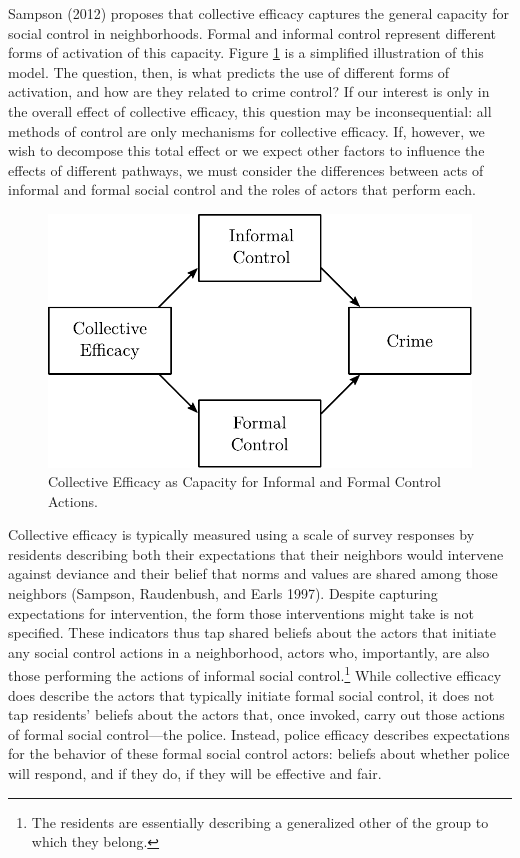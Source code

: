 \documentclass [11pt, proquest] {uwthesis}[2015/03/03]
\begin{document}
Sampson (2012) proposes that collective efficacy captures the general capacity for social control in neighborhoods. Formal and informal control represent different forms of activation of this capacity. Figure \ref{fig:controldiagram} is a simplified illustration of this model. The question, then, is what predicts the use of different forms of activation, and how are they related to crime control? If our interest is only in the overall effect of collective efficacy, this question may be inconsequential: all methods of control are only mechanisms for collective efficacy. If, however, we wish to decompose this total effect or we expect other factors to influence the effects of different pathways, we must consider the differences between acts of informal and formal social control and the roles of actors that perform each.
\begin{figure}

{\centering \includegraphics[width=0.6\linewidth]{./figure/ch3/ce_pe_framework} 

}

\caption{Collective Efficacy as Capacity for Informal and Formal Control Actions.}\label{fig:controldiagram}
\end{figure}
Collective efficacy is typically measured using a scale of survey responses by residents describing both their expectations that their neighbors would intervene against deviance and their belief that norms and values are shared among those neighbors (Sampson, Raudenbush, and Earls 1997). Despite capturing expectations for intervention, the form those interventions might take is not specified. These indicators thus tap shared beliefs about the actors that initiate any social control actions in a neighborhood, actors who, importantly, are also those performing the actions of informal social control.\footnote{The residents are essentially describing a generalized other of the group to which they belong.} While collective efficacy does describe the actors that typically initiate formal social control, it does not tap residents' beliefs about the actors that, once invoked, carry out those actions of formal social control---the police. Instead, police efficacy describes expectations for the behavior of these formal social control actors: beliefs about whether police will respond, and if they do, if they will be effective and fair.
\end{document}
